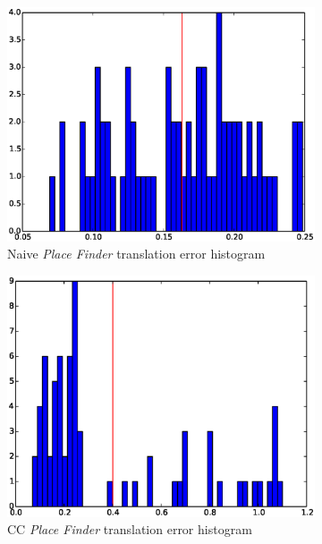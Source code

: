 \begin{figure}[htpb]
  \begin{subfigure}[b]{6cm}
          \includegraphics[width=\linewidth]{img/large_desktop/naive_empty_dist.eps}
          \caption{Naive \textit{Place Finder} translation error histogram}                
          \label{fig:large_naive_empty_dist}
  \end{subfigure}   
  \qquad
  \begin{subfigure}[b]{6cm}
         \includegraphics[width=\linewidth]{img/large_desktop/CC_empty_dist.eps}
         \caption{CC \textit{Place Finder} translation error histogram}                
         \label{fig:large_CC_empty_dist}
  \end{subfigure}
  \caption{}
  \label{fig:large_place_finder_dist}
\end{figure}

